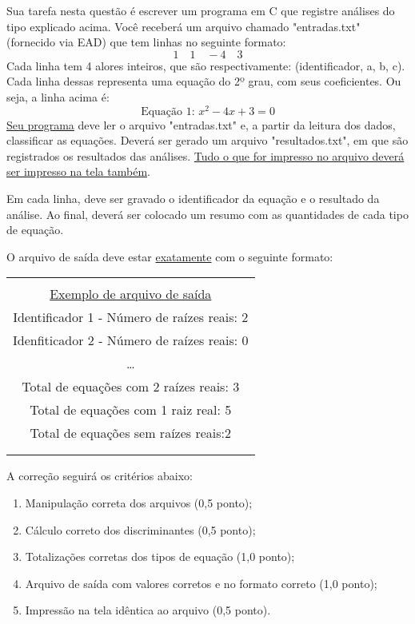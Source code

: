 \documentclass[12pt,a4paper]{article}
\begin{document}
Sua tarefa nesta questão é escrever um programa em C que registre análises do tipo explicado acima. Você receberá um arquivo chamado "entradas.txt" (fornecido via EAD) que tem linhas no seguinte formato: $$1\quad 1 \quad -4 \quad 3$$ Cada linha tem 4 alores inteiros, que são respectivamente: (identificador, a, b, c). Cada linha dessas representa uma equação do 2º grau, com seus coeficientes. Ou seja, a linha acima é: $$\text{Equação 1: }x^2 - 4x + 3 = 0$$ \underline{Seu programa} deve ler o arquivo "entradas.txt" e, a partir da leitura dos dados, classificar as equações. Deverá ser gerado um arquivo "resultados.txt", em que são registrados os resultados das análises. \underline{Tudo o que for impresso no arquivo deverá} \underline{ser impresso na tela também}.

Em cada linha, deve ser gravado o identificador da equação e o resultado da análise. Ao final, deverá ser colocado um resumo com as quantidades de cada tipo de equação.

O arquivo de saída deve estar \underline{exatamente} com o seguinte formato:\\

\begin{tabular}{c}
\hline \\ \hline \\ \underline{Exemplo de arquivo de saída} \\ Identificador 1 - Número de raízes reais: 2\\ Idenfiticador 2 - Número de raízes reais: 0 \\ \dots \\ Total de equações com 2 raízes reais: 3 \\ Total de equações com 1 raiz real: 5 \\ Total de equações sem raízes reais:2 \\ \hline \\ \hline \\
\end{tabular}

A correção seguirá os critérios abaixo:
\begin{enumerate}[label=\alph*.]
\item Manipulação correta dos arquivos (0,5 ponto);
\item Cálculo correto dos discriminantes (0,5 ponto);
\item Totalizações corretas dos tipos de equação (1,0 ponto);
\item Arquivo de saída com valores corretos e no formato correto (1,0 ponto);
\item Impressão na tela idêntica ao arquivo (0,5 ponto).
\end{enumerate}
\end{document}
